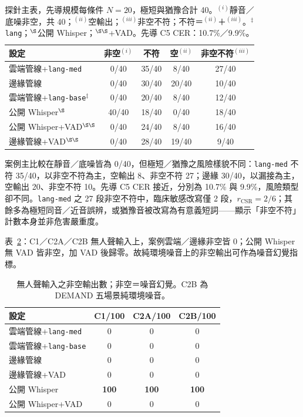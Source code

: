 \documentclass[11pt,a4paper]{article}
\newcommand{\CloudASR}{雲端管線}
\newcommand{\EdgeASR}{邊緣管線}
\newcommand{\LangMVOne}{\texttt{lang-med}}
\newcommand{\LangLegacy}{\texttt{lang-base}}
\begin{document}
\begin{table}[!t]
\centering
\footnotesize
\setlength{\tabcolsep}{7pt}
\renewcommand{\arraystretch}{1.08}
\begin{tabular}{@{}lcccc@{}}
\toprule
\textbf{設定} & \textbf{非空}$^{(i)}$ & \textbf{不符} & \textbf{空}$^{(ii)}$ & \textbf{非空不符}$^{(iii)}$ \\
\midrule
\CloudASR{}+\LangMVOne{} & 0/40 & 35/40 & 8/40 & 27/40 \\
\EdgeASR{} & 0/40 & 30/40 & 20/40 & 10/40 \\
\midrule
\CloudASR{}+\LangLegacy{}$^\ddagger$ & 0/40 & 20/40 & 8/40 & 12/40 \\
公開 Whisper$^\S$ & 40/40 & 18/40 & 0/40 & 18/40 \\
公開 Whisper+VAD$^{\S\S}$ & 0/40 & 24/40 & 8/40 & 16/40 \\
\EdgeASR{}+VAD$^{\S\S}$ & 0/40 & 28/40 & 19/40 & 9/40 \\
\bottomrule
\end{tabular}
\caption{\label{tab:halluc} 探針主表，先導規模每條件 $N{=}20$，極短與猶豫合計 40。$^{(i)}$靜音／底噪非空，共 40；$^{(ii)}$空輸出；$^{(iii)}$非空不符；不符＝$^{(ii)}$＋$^{(iii)}$。$^\ddagger$\texttt{lang}；$^\S$公開 Whisper；$^{\S\S}$+VAD。先導 C5 CER：10.7\%／9.9\%。}
\end{table}

案例主比較在靜音／底噪皆為 0/40，但極短／猶豫之風險樣貌不同：\LangMVOne{} 不符 35/40，以非空不符為主，空輸出 8、非空不符 27；邊緣 30/40，以漏接為主，空輸出 20、非空不符 10。先導 C5 CER 接近，分別為 10.7\% 與 9.9\%，風險類型卻不同。\LangMVOne{} 之 27 段非空不符中，臨床敏感改寫僅 2 段，$r_{\mathrm{CSR}}{=}2/6$；其餘多為極短同音／近音誤辨，或猶豫音被改寫為有意義短詞——顯示「非空不符」計數本身並非危害嚴重度。

表~\ref{tab:nonspeech_acpdrp}：C1／C2A／C2B 無人聲輸入上，案例雲端／邊緣非空皆 0；公開 Whisper 無 VAD 皆非空，加 VAD 後歸零。故純環境噪音上的非空輸出可作為噪音幻覺指標。

\begin{table}[!t]
\centering
\footnotesize
\setlength{\tabcolsep}{8pt}
\renewcommand{\arraystretch}{1.06}
\begin{tabular}{@{}lccc@{}}
\toprule
\textbf{設定} & \textbf{C1}/100 & \textbf{C2A}/100 & \textbf{C2B}/100 \\
\midrule
\CloudASR{}+\LangMVOne{} & 0 & 0 & 0 \\
\CloudASR{}+\LangLegacy{} & 0 & 0 & 0 \\
\EdgeASR{} & 0 & 0 & 0 \\
\EdgeASR{}+VAD & 0 & 0 & 0 \\
公開 Whisper & \textbf{100} & \textbf{100} & \textbf{100} \\
公開 Whisper+VAD & 0 & 0 & 0 \\
\bottomrule
\end{tabular}
\caption{\label{tab:nonspeech_acpdrp} 無人聲輸入之非空輸出數；非空＝噪音幻覺。C2B 為 DEMAND 五場景純環境噪音。}
\end{table}
\end{document}
